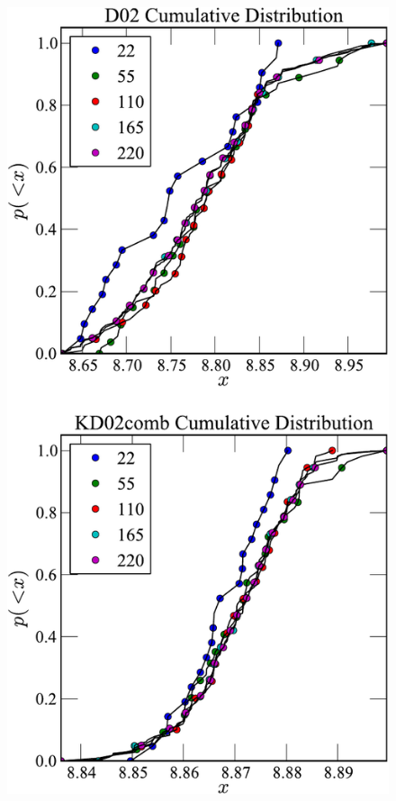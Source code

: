 \documentclass{emulateapj}
\begin{document}
\begin{figure}[!ht]
\centerline{
\includegraphics[width=0.65\columnwidth]{exampledata_n200_testcomplete.pdf}
}
\end{figure}
\end{document}
